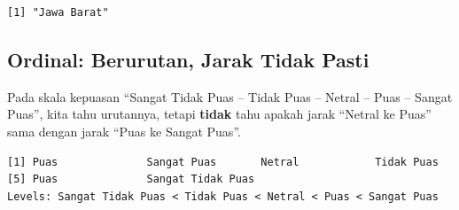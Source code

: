 \documentclass[
  indonesian,
  letterpaper,
]{book}
\newenvironment{Shaded}{\begin{snugshade}}{\end{snugshade}}
\newcommand{\AttributeTok}[1]{\textcolor[rgb]{0.40,0.45,0.13}{#1}}
\newcommand{\CommentTok}[1]{\textcolor[rgb]{0.37,0.37,0.37}{#1}}
\newcommand{\ConstantTok}[1]{\textcolor[rgb]{0.56,0.35,0.01}{#1}}
\newcommand{\FunctionTok}[1]{\textcolor[rgb]{0.28,0.35,0.67}{#1}}
\newcommand{\NormalTok}[1]{\textcolor[rgb]{0.00,0.23,0.31}{#1}}
\newcommand{\OtherTok}[1]{\textcolor[rgb]{0.00,0.23,0.31}{#1}}
\newcommand{\SpecialCharTok}[1]{\textcolor[rgb]{0.37,0.37,0.37}{#1}}
\newcommand{\StringTok}[1]{\textcolor[rgb]{0.13,0.47,0.30}{#1}}
\begin{document}
\begin{verbatim}
[1] "Jawa Barat"
\end{verbatim}

\subsection{Ordinal: Berurutan, Jarak Tidak
Pasti}\label{ordinal-berurutan-jarak-tidak-pasti}

Pada skala kepuasan ``Sangat Tidak Puas -- Tidak Puas -- Netral -- Puas
-- Sangat Puas'', kita tahu urutannya, tetapi \textbf{tidak} tahu apakah
jarak ``Netral ke Puas'' sama dengan jarak ``Puas ke Sangat Puas''.

\begin{Shaded}
\end{Shaded}

\begin{verbatim}
[1] Puas              Sangat Puas       Netral            Tidak Puas       
[5] Puas              Sangat Tidak Puas
Levels: Sangat Tidak Puas < Tidak Puas < Netral < Puas < Sangat Puas
\end{verbatim}

\begin{Shaded}
\end{Shaded}
\end{document}
